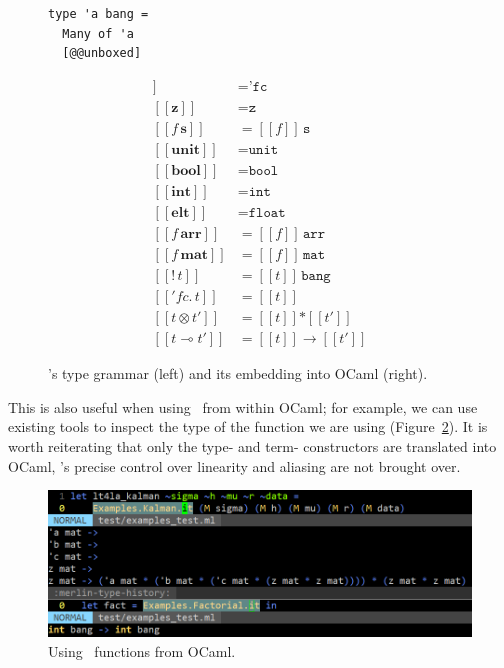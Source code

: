\begin{figure}[t]
\begin{minipage}{.3\textwidth}
\begin{verbatim}
type 'a bang =
  Many of 'a
  [@@unboxed]
        \end{verbatim}
    \end{minipage}
    \begin{minipage}{.3\textwidth}
        \begin{align*}
            [\![ '\!f\!c ]\!] &= \texttt{'fc} \\
            [\![ \textbf{z} ]\!] &= \texttt{z}\\
            [\![ f \, \textbf{s} ]\!] &= [\![ f ]\!]\, \texttt{s}\\
            [\![ \textbf{unit} ]\!] &= \texttt{unit}\\
            [\![ \textbf{bool} ]\!] &= \texttt{bool}\\
            [\![ \textbf{int} ]\!] &= \texttt{int}\\
            [\![ \textbf{elt} ]\!] &= \texttt{float}\\
            [\![ f\, \textbf{arr} ]\!] &= [\![ f ]\!]\, \texttt{arr}\\
            [\![ f\, \textbf{mat} ]\!] &= [\![ f ]\!]\, \texttt{mat}\\
            [\![ \textbf{!} \, t ]\!] &= [\![ t ]\!]\, \texttt{bang}\\
            [\![  '\!f\!c.\, t ]\!] &= [\![ t ]\!]\\
            [\![ t \otimes t' ]\!] &= [\![ t ]\!] \texttt{*} [\![ t' ]\!]\\
            [\![ t \multimap t' ]\!] &= [\![ t ]\!] \rightarrow [\![ t' ]\!]
        \end{align*}
    \end{minipage}
    \caption{\lang's type grammar (left) and its embedding into OCaml
        (right).}\label{fig:type_grammar}
\end{figure}

This is also useful when using \lang\ from within OCaml; for example, we can
use existing tools to inspect the type of the function we are using
(Figure~\ref{fig:build}). It is worth reiterating that only the type- and term-
constructors are translated into OCaml, \lang's precise control over linearity
and aliasing are not brought over.

\begin{figure}[t]
    \centering
    \includegraphics[width=\textwidth]{impl_build}
    \caption{Using \lang\ functions from OCaml.}\label{fig:build}
\end{figure}

